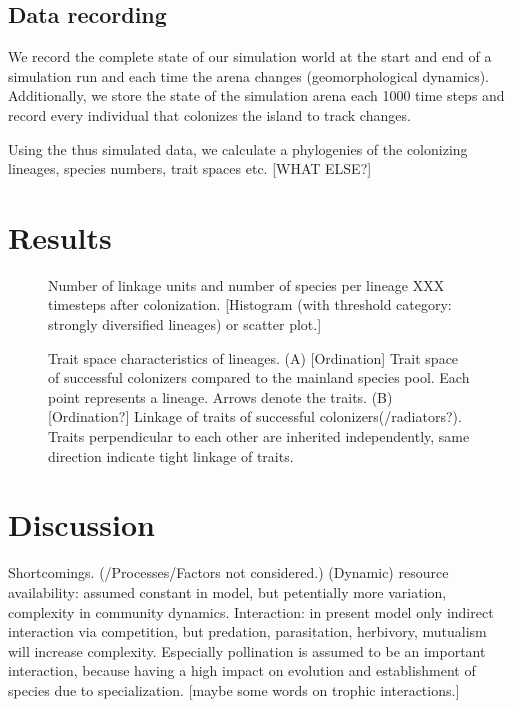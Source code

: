 \documentclass[a4paper]{scrartcl}
\begin{document}
\subsection{Data recording}
We record the complete state of our simulation world at the start and end of a simulation run and each time the arena changes (geomorphological dynamics).
Additionally, we store the state of the simulation arena each 1000 %
time steps and record every individual that colonizes the island to track changes.

Using the thus simulated data, we calculate a phylogenies of the colonizing lineages, species numbers, trait spaces etc. [WHAT ELSE?]

\section{Results}

\begin{figure}
  \caption{Number of linkage units and number of species per lineage XXX timesteps after colonization.
    [Histogram (with threshold category: strongly diversified lineages) or scatter plot.]}
  \label{specieslinkage}
\end{figure}

\begin{figure}
  \caption{Trait space characteristics of lineages.
    (A) [Ordination] Trait space of successful colonizers compared to the mainland species pool. Each point represents a lineage.
    Arrows denote the traits.
    (B) [Ordination?] Linkage of traits of successful colonizers(/radiators?). Traits perpendicular to each other are inherited independently,
  same direction indicate tight linkage of traits.}
  \label{traitspace}
\end{figure}


\section{Discussion}
Shortcomings. (/Processes/Factors not considered.)
(Dynamic) resource availability: assumed constant in model, but petentially more variation, complexity in community dynamics.
Interaction: in present model only indirect interaction via competition, but predation, parasitation, herbivory, mutualism will increase complexity.
Especially pollination is assumed to be an important interaction, because having a high impact on evolution and establishment of species due to specialization.
[maybe some words on trophic interactions.]
\end{document}
